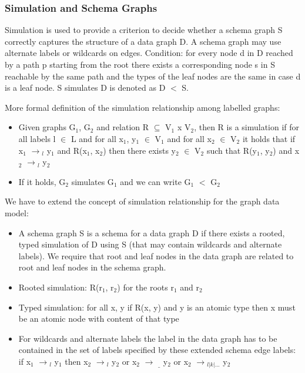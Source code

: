 \subsubsection{Simulation and Schema Graphs}
Simulation is used to provide a criterion to decide whether a schema graph S correctly captures the structure of a data graph D. A schema graph may use alternate labels or wildcards on edges. Condition: for every node d in D reached by a path p starting from the root there exists a corresponding node s in S reachable by the same path and the types of the leaf nodes are the same in case d is a leaf node. S simulates D is denoted as D $<$ S.

More formal definition of the simulation relationship among labelled graphs:
\begin{itemize}
  \item Given graphs G$_{1}$, G$_{2}$ and relation R $\subseteq$ V$_{1}$ x V$_{2}$, then R is a simulation if for all labels l $\in$ L and for all x$_{1}$, y$_{1}$ $\in$ V$_{1}$ and for all x$_{2}$ $\in$ V$_{2}$ it holds that if x$_{1}$ $\rightarrow$$_{l}$ y$_{1}$ and R(x$_{1}$, x$_{2}$) then there exists y$_{2}$ $\in$ V$_{2}$ such that R(y$_{1}$, y$_{2}$) and x$_{2}$ $\rightarrow$$_{l}$ y$_{2}$
  \item If it holds, G$_{2}$ simulates G$_{1}$ and we can write G$_{1}$ $<$ G$_{2}$
\end{itemize}

We have to extend the concept of simulation relationship for the graph data model:
\begin{itemize}
  \item A schema graph S is a schema for a data graph D if there exists a rooted, typed simulation of D using S (that may contain wildcards and alternate labels). We require that root and leaf nodes in the data graph are related to root and leaf nodes in the schema graph. 
  \item Rooted simulation: R(r$_{1}$, r$_{2}$) for the roots r$_{1}$ and r$_{2}$  
  \item Typed simulation: for all x, y if R(x, y) and y is an atomic type then x must be an atomic node with content of that type
  \item For wildcards and alternate labels the label in the data graph has to be contained in the set of labels specified by these extended schema edge labels: if x$_{1}$ $\rightarrow$$_{l}$ y$_{1}$ then x$_{2}$ $\rightarrow$$_{l}$ y$_{2}$ or x$_{2}$ $\rightarrow$ $_{\_}$ y$_{2}$ or x$_{2}$ $\rightarrow$$_{l|k|...}$ y$_{2}$

\end{itemize}

